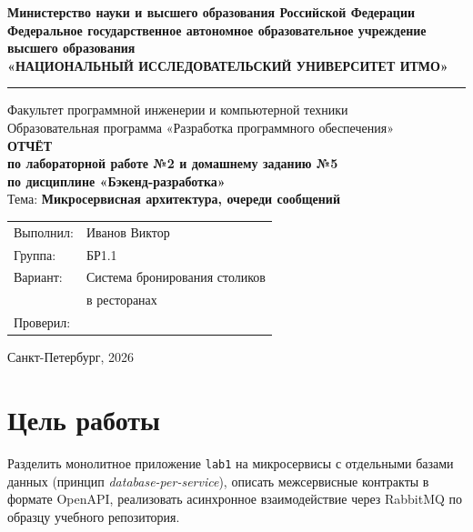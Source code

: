 \documentclass[a4paper,14pt]{extarticle}
\begin{document}
\begin{titlepage}
  \begin{center}
    \textbf{Министерство науки и высшего образования Российской Федерации}\\[0.3cm]
    \textbf{Федеральное государственное автономное образовательное учреждение\\
    высшего образования}\\[0.3cm]
    \textbf{«НАЦИОНАЛЬНЫЙ ИССЛЕДОВАТЕЛЬСКИЙ УНИВЕРСИТЕТ ИТМО»}\\[0.5cm]
    \hrule
    \vspace{0.3cm}
    Факультет программной инженерии и компьютерной техники\\[0.2cm]
    Образовательная программа «Разработка программного обеспечения»\\[2cm]

    \large\textbf{ОТЧЁТ}\\[0.3cm]
    \textbf{по лабораторной работе №2 и домашнему заданию №5}\\[0.3cm]
    \textbf{по дисциплине «Бэкенд-разработка»}\\[0.5cm]
    \normalsize Тема: \textbf{Микросервисная архитектура, очереди сообщений}\\[3cm]

    \begin{flushright}
      \begin{tabular}{ll}
        Выполнил: & Иванов Виктор\\
        Группа:   & БР1.1\\
        Вариант:  & Система бронирования столиков\\
                  & в ресторанах\\[0.5cm]
        Проверил: & \\
      \end{tabular}
    \end{flushright}

    \vfill
    Санкт-Петербург, 2026
  \end{center}
\end{titlepage}

\tableofcontents
\newpage

\section{Цель работы}

Разделить монолитное приложение \texttt{lab1} на микросервисы с отдельными базами данных (принцип \textit{database-per-service}), описать межсервисные контракты в формате OpenAPI, реализовать асинхронное взаимодействие через RabbitMQ по образцу учебного репозитория.
\end{document}
